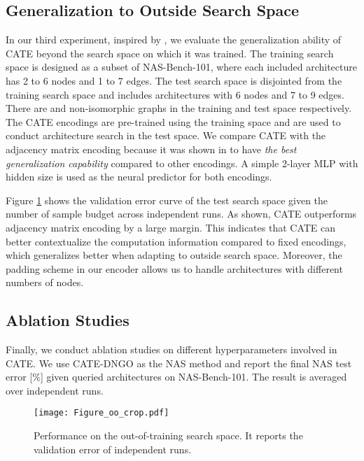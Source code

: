 \subsection{Generalization to Outside Search Space}
In our third experiment, inspired by \cite{white2020study}, we evaluate the generalization ability of CATE beyond the search space on which it was trained. The training search space is designed as a subset of NAS-Bench-101, where each included architecture has 2 to 6 nodes and 1 to 7 edges. The test search space is disjointed from the training search space and includes architectures with 6 nodes and 7 to 9 edges. There are  and  non-isomorphic graphs in the training and test space respectively. The CATE encodings are pre-trained using the training space and are used to conduct architecture search in the test space. We compare CATE with the adjacency matrix encoding because it was shown in \cite{white2020study} to have \emph{the best generalization capability} compared to other encodings. A simple 2-layer MLP with hidden size  is used as the neural predictor for both encodings. 

Figure \ref{fig.oo} shows the validation error curve of the test search space given the number of  sample budget across  independent runs. As shown, CATE outperforms adjacency matrix encoding by a large margin.
This indicates that CATE can better contextualize the computation information compared to fixed encodings, which generalizes better when adapting to outside search space. Moreover, the padding scheme in our encoder allows us to handle architectures with different numbers of nodes.

\subsection{Ablation Studies}
\label{sec:ablation}
Finally, we conduct ablation studies on different hyperparameters involved in CATE. We use CATE-DNGO as the NAS method and report the final NAS test error [\%] given  queried architectures on NAS-Bench-101. The result is averaged over  independent runs.

\begin{figure}[t]
	\centering
	\texttt{[image: Figure\_oo\_crop.pdf]}
\caption{Performance on the out-of-training search space. It reports the validation error of  independent runs.}
	\label{fig.oo}
\end{figure}

